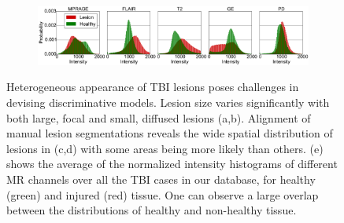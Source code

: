 \begin{figure}[h]
\begin{subfigure}[b]{0.22\textwidth}
	\caption{}
	\label{fig:spatialMapSide}
\end{subfigure}
\\[1ex] %
\centering
\begin{subfigure}[b]{1.0\textwidth}
\centering
	\includegraphics[clip=true, trim=0pt 0pt 0pt 0pt, width=1.0\textwidth]{figures/introduction/trio/intHistoTrio1_5mods.png}
	\caption{}
	\label{fig:histInt}
\end{subfigure}

\caption{Heterogeneous appearance of TBI lesions poses challenges in devising discriminative models. Lesion size varies significantly with both large, focal and small, diffused lesions (a,b). Alignment of manual lesion segmentations reveals the wide spatial distribution of lesions in (c,d) with some areas being more likely than others. (e) shows the average of the normalized intensity histograms of different MR channels over all the TBI cases in our database, for healthy (green) and injured (red) tissue. One can observe a large overlap between the distributions of healthy and non-healthy tissue.}
\label{fig:tbiChallenges}
\end{figure}